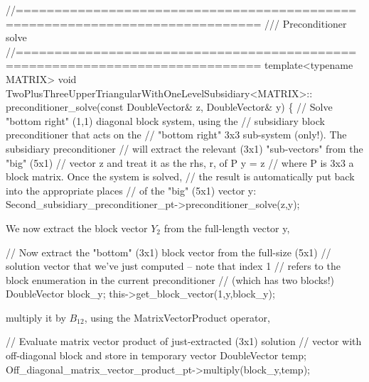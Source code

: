 \begin{DoxyCodeInclude}
 \textcolor{comment}{//=============================================================================}\textcolor{comment}{}
\textcolor{comment}{ /// Preconditioner solve }
\textcolor{comment}{} \textcolor{comment}{//=============================================================================}
 \textcolor{keyword}{template}<\textcolor{keyword}{typename} MATRIX> 
 \textcolor{keywordtype}{void} TwoPlusThreeUpperTriangularWithOneLevelSubsidiary<MATRIX>::
 preconditioner\_solve(\textcolor{keyword}{const} DoubleVector& z, DoubleVector& y)
 \{
  \textcolor{comment}{// Solve "bottom right" (1,1) diagonal block system, using the }
  \textcolor{comment}{// subsidiary block preconditioner that acts on the}
  \textcolor{comment}{// "bottom right" 3x3 sub-system (only!). The subsidiary preconditioner }
  \textcolor{comment}{// will extract the relevant (3x1) "sub-vectors" from the "big" (5x1)}
  \textcolor{comment}{// vector z and treat it as the rhs, r, of P y = z}
  \textcolor{comment}{// where P is 3x3 a block matrix. Once the system is solved,}
  \textcolor{comment}{// the result is automatically put back into the appropriate places }
  \textcolor{comment}{// of the "big" (5x1) vector y:}
  Second\_subsidiary\_preconditioner\_pt->preconditioner\_solve(z,y);

\end{DoxyCodeInclude}


We now extract the block vector $ Y_2 $ from the full-\/length vector {\ttfamily y}, 
\begin{DoxyCodeInclude}
    
  \textcolor{comment}{// Now extract the "bottom" (3x1) block vector from the full-size (5x1)}
  \textcolor{comment}{// solution vector that we've just computed -- note that index 1}
  \textcolor{comment}{// refers to the block enumeration in the current preconditioner}
  \textcolor{comment}{// (which has two blocks!)}
  DoubleVector block\_y;
  this->get\_block\_vector(1,y,block\_y);

\end{DoxyCodeInclude}


multiply it by $ B_{12} $, using the {\ttfamily Matrix\+Vector\+Product} operator, 
\begin{DoxyCodeInclude}

  \textcolor{comment}{// Evaluate matrix vector product of just-extracted (3x1) solution }
  \textcolor{comment}{// vector with off-diagonal block and store in temporary vector}
  DoubleVector temp;
  Off\_diagonal\_matrix\_vector\_product\_pt->multiply(block\_y,temp);

\end{DoxyCodeInclude}


